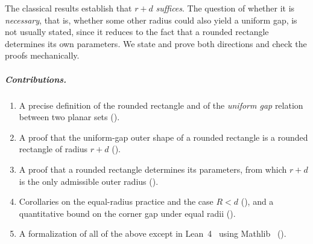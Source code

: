 \documentclass[a4paper,UKenglish,cleveref,autoref,thm-restate]{lipics-v2021}
\begin{document}
The classical results establish that $r + d$ \emph{suffices}. The question of whether it is
\emph{necessary}, that is, whether some other radius could also yield a uniform gap, is not
usually stated, since it reduces to the fact that a rounded rectangle determines its own
parameters. We state and prove both directions and check the proofs mechanically.

\subparagraph*{Contributions.}
\begin{enumerate}
  \item A precise definition of the rounded rectangle and of the \emph{uniform gap} relation
        between two planar sets ().
  \item A proof that the uniform-gap outer shape of a rounded rectangle is a rounded rectangle of
        radius $r + d$ ().
  \item A proof that a rounded rectangle determines its parameters, from which $r + d$ is the
        only admissible outer radius ().
  \item Corollaries on the equal-radius practice and the case $R < d$ (),
        and a quantitative bound on the corner gap under equal radii ().
  \item A formalization of all of the above except  in Lean~4~\cite{lean4} using
        Mathlib~\cite{mathlib2020} ().
\end{enumerate}
\end{document}
